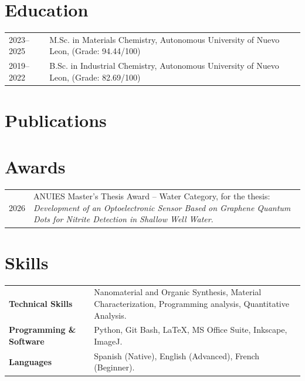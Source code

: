 \documentclass[a4paper,12pt]{article}
\begin{document}
\section{Education}
\begin{tabularx}{\linewidth}{@{}l X@{} }
2023–2025 & M.Sc. in Materials Chemistry, Autonomous University of Nuevo Leon, (Grade: 94.44/100) \\
2019–2022 & B.Sc. in Industrial Chemistry, Autonomous University of Nuevo Leon, (Grade: 82.69/100) \\
\end{tabularx}


\section{Publications}
\begin{refsection}
\nocite{*}
\printbibliography[heading=none]
\end{refsection}

\section{Awards}
\begin{tabularx}{\linewidth}{@{}l X@{}}
2026 & ANUIES Master's Thesis Award -- Water Category, for the thesis: \textit{Development of an Optoelectronic Sensor Based on Graphene Quantum Dots for Nitrite Detection in Shallow Well Water}. \\
\end{tabularx}

\section{Skills}
\begin{tabularx}{\linewidth}{@{}l X@{}}
\textbf{Technical Skills} & Nanomaterial and Organic Synthesis, Material Characterization, Programming analysis, Quantitative Analysis.\\
\textbf{Programming \& Software} & Python, Git Bash, \LaTeX, MS Office Suite, Inkscape, ImageJ. \\
\textbf{Languages} & Spanish (Native), English (Advanced), French (Beginner). \\  
\end{tabularx}

\vfill
{}
\end{document}
